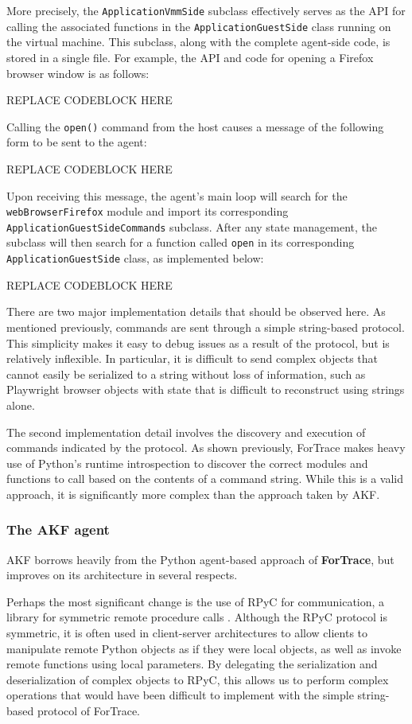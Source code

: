 More precisely, the \texttt{ApplicationVmmSide} subclass effectively
serves as the API for calling the associated functions in the
\texttt{ApplicationGuestSide} class running on the virtual machine. This
subclass, along with the complete agent-side code, is stored in a single
file. For example, the API and code for opening a Firefox browser window
is as follows:

REPLACE CODEBLOCK HERE

Calling the \texttt{open()} command from the host causes a message of
the following form to be sent to the agent:

REPLACE CODEBLOCK HERE

Upon receiving this message, the agent's main loop will search for the
\texttt{webBrowserFirefox} module and import its corresponding
\texttt{ApplicationGuestSideCommands} subclass. After any state
management, the subclass will then search for a function called
\texttt{open} in its corresponding \texttt{ApplicationGuestSide} class,
as implemented below:

REPLACE CODEBLOCK HERE

There are two major implementation details that should be observed here.
As mentioned previously, commands are sent through a simple string-based
protocol. This simplicity makes it easy to debug issues as a result of
the protocol, but is relatively inflexible. In particular, it is
difficult to send complex objects that cannot easily be serialized to a
string without loss of information, such as Playwright browser objects
with state that is difficult to reconstruct using strings alone.

The second implementation detail involves the discovery and execution of
commands indicated by the protocol. As shown previously, ForTrace makes
heavy use of Python's runtime introspection to discover the correct
modules and functions to call based on the contents of a command string.
While this is a valid approach, it is significantly more complex than
the approach taken by AKF.

\subsubsection{The AKF agent}\label{the-akf-agent}

AKF borrows heavily from the Python agent-based approach of
\textbf{ForTrace}, but improves on its architecture in several respects.

Perhaps the most significant change is the use of RPyC for
communication, a library for symmetric remote procedure calls
\cite{TomerfilibaorgRpyc2025}. Although the RPyC protocol is
symmetric, it is often used in client-server architectures to allow
clients to manipulate remote Python objects as if they were local
objects, as well as invoke remote functions using local parameters. By
delegating the serialization and deserialization of complex objects to
RPyC, this allows us to perform complex operations that would have been
difficult to implement with the simple string-based protocol of
ForTrace.

